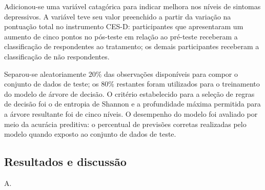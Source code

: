 Adicionou-se uma variável catagórica para indicar melhora nos níveis de sintomas depressivos. A variável teve seu valor preenchido a partir da variação na pontuação total no instrumento CES-D:
participantes que apresentaram um aumento de cinco pontos no pós-teste em relação ao pré-teste receberam a classificação de respondentes ao tratamento; os demais participantes receberam a
classificação de não respondentes.

Separou-se aleatoriamente $20\%$ das observações disponíveis para compor o conjunto de dados de teste; os $80\%$ restantes foram utilizados para o treinamento do modelo de árvore de decisão.
O critério estabelecido para a seleção de regras de decisão foi o de entropia de Shannon \cite{ScikitLearn} e a profundidade máxima permitida para a árvore resultante foi de cinco níveis. O
desempenho do modelo foi avaliado por meio da acurácia preditiva: o percentual de previsões corretas realizadas pelo modelo quando exposto ao conjunto de dados de teste.

\subsection{Resultados e discussão}

A.
